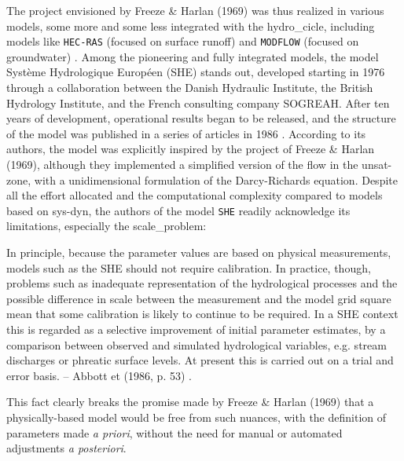\documentclass[./main_en.tex]{subfiles}
\begin{document}
\par The project envisioned by Freeze \& Harlan (1969) was thus realized in various models, some more and some less integrated with the \gls{hydro_cicle}, including models like \texttt{HEC-RAS} (focused on surface runoff) and \texttt{MODFLOW} (focused on groundwater) \cite{Simmons2020a}. Among the pioneering and fully integrated models, the \gls{model} Système Hydrologique Européen (SHE) stands out, developed starting in 1976 through a collaboration between the Danish Hydraulic Institute, the British Hydrology Institute, and the French consulting company SOGREAH. After ten years of development, operational results began to be released, and the structure of the \gls{model} was published in a series of articles in 1986 \cite{Abbott1986a, Abbott1986b}. According to its authors, the \gls{model} was explicitly inspired by the project of Freeze \& Harlan (1969), although they implemented a simplified version of the flow in the \gls{unsat-zone}, with a unidimensional formulation of the Darcy-Richards equation. Despite all the effort allocated and the computational complexity compared to models based on \gls{sys-dyn}, the authors of the \gls{model} \texttt{SHE} readily acknowledge its limitations, especially the \gls{scale_problem}:
\begin{adjustwidth}{100pt}{0pt}
\medskip
\small
In principle, because the parameter values are based on physical measurements, models such as the SHE should not require calibration. In practice, though, problems such as inadequate representation of the hydrological processes and the possible difference in scale between the measurement and the model grid square mean that some calibration is likely to continue to be required. In a SHE context this is regarded as a selective improvement of initial parameter estimates, by a comparison between observed and simulated hydrological variables, e.g. stream discharges or phreatic surface levels. At present this is carried out on a trial and error basis. -- Abbott et  (1986, p. 53) \cite{Abbott1986a}.
\medskip
\end{adjustwidth}
\noindent This fact clearly breaks the promise made by Freeze \& Harlan (1969) that a physically-based \gls{model} would be free from such nuances, with the definition of \gls{parameters} made \textit{a priori}, without the need for manual or automated adjustments \textit{a posteriori}. 
\end{document}
